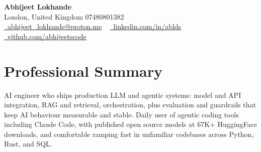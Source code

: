 \documentclass[a4paper,10pt]{article}
\begin{document}
    \begin{center}
        {\Huge\bfseries Abhijeet Lokhande}
        \\[2pt] {\color{muted}London, United Kingdom \textbar{} 07480801382}\\
        \small
        \href{mailto:abhijeet_lokhande@proton.me}{\raisebox{-0.2\height}{\color{primary}\faEnvelope}\  \underline{abhijeet\_lokhande@proton.me}} ~
        \href{https://www.linkedin.com/in/ablds/}{\raisebox{-0.2\height}{\color{primary}\faLinkedin}\ \underline{linkedin.com/in/ablds}}  ~
        \href{https://github.com/abhijeetscode}{\raisebox{-0.2\height}{\color{primary}\faGithub}\ \underline{github.com/abhijeetscode}}
    \end{center}

\section{Professional Summary}
\vspace{-5pt}
{\color{muted}AI engineer who ships production LLM and agentic systems: model and API integration, RAG and retrieval, orchestration, plus evaluation and guardrails that keep AI behaviour measurable and stable. Daily user of agentic coding tools including Claude Code, with published open source models at 67K+ HuggingFace downloads, and comfortable ramping fast in unfamiliar codebases across Python, Rust, and SQL.}
\vspace{2pt}

\end{document}
